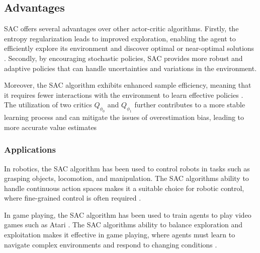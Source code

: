 
\subsection{Advantages}

SAC offers several advantages over other actor-critic algorithms. Firstly, the entropy regularization leads to improved exploration, enabling the agent to efficiently explore its environment and discover optimal or near-optimal solutions \cite{SAC_Paper}. Secondly, by encouraging stochastic policies, SAC provides more robust and adaptive policies that can handle uncertainties and variations in the environment.

Moreover, the SAC algorithm exhibits enhanced sample efficiency, meaning that it requires fewer interactions with the environment to learn effective policies \cite{SAC_Applications_Paper}. The utilization of two critics $Q_{\phi_0}$ and $Q_{\phi_1}$ further contributes to a more stable learning process and can mitigate the issues of overestimation bias, leading to more accurate value estimates \cite{SAC_Paper}

\subsubsection{Applications}


In robotics, the SAC algorithm has been used to control robots in tasks such as grasping objects, locomotion, and manipulation. The SAC algorithms ability to handle continuous action spaces makes it a suitable choice for robotic control, where fine-grained control is often required \cite{SAC_Applications_Paper}.

In game playing, the SAC algorithm has been used to train agents to play video games such as Atari \cite{SAC_Discrete_Paper}. The SAC algorithms ability to balance exploration and exploitation makes it effective in game playing, where agents must learn to navigate complex environments and respond to changing conditions \cite{SAC_VideoGames_Paper}.

% 

